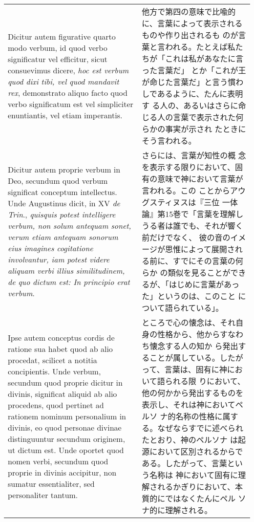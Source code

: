 \documentclass[10pt]{jsarticle} %
\begin{document}
\begin{longtable}{p{21em}p{21em}}
\\


Dicitur autem figurative quarto modo verbum, id quod verbo
 significatur vel efficitur, sicut consuevimus dicere, {\itshape hoc est verbum
 quod dixi tibi, vel quod mandavit rex}, demonstrato aliquo facto quod
 verbo significatum est vel simpliciter enuntiantis, vel etiam
 imperantis. 
&

他方で第四の意味で比喩的に、言葉によって表示されるものや作り出されるも
 のが言葉と言われる。たとえば私たちが「これは私があなたに言った言葉だ」
 とか「これが王が命じた言葉だ」と言う慣わしであるように、たんに表明す
 る人の、あるいはさらに命じる人の言葉で表示された何らかの事実が示され
 たときにそう言われる。


\\

Dicitur autem proprie verbum in Deo, secundum quod verbum
 significat conceptum intellectus. 
Unde Augustinus dicit, in XV {\itshape de
 Trin}., {\itshape quisquis potest intelligere verbum, non solum antequam sonet,
 verum etiam antequam sonorum eius imagines cogitatione involvantur,
 iam potest videre aliquam verbi illius similitudinem, de quo dictum
 est: In principio erat verbum}. 

&

さらには、言葉が知性の概
 念を表示する限りにおいて、固有の意味で神において言葉が言われる。この
 ことからアウグスティヌスは『三位
 一体論』第15巻で「言葉を理解しうる者は誰でも、それが響く前だけでなく、
 彼の音のイメージが思惟によって展開される前に、すでにその言葉の何らか
 の類似を見ることができるが、「はじめに言葉があった」というのは、このこと
 について語られている」。

\\

Ipse autem conceptus cordis de ratione
 sua habet quod ab alio procedat, scilicet a notitia
 concipientis.
 Unde verbum, secundum quod proprie dicitur in divinis,
 significat aliquid ab alio procedens, quod pertinet ad rationem
 nominum personalium in divinis, eo quod personae divinae
 distinguuntur secundum originem, ut dictum est. Unde oportet quod
 nomen verbi, secundum quod proprie in divinis accipitur, non sumatur
 essentialiter, sed personaliter tantum.

&

ところで心の懐念は、それ自身の性格から、他からすなわち懐念する人の知か
 ら発出することが属している。したがって、言葉は、固有に神において語られる限
 りにおいて、他の何かから発出するものを表示し、それは神においてペルソ
 ナ的名称の性格に属する。なぜならすでに述べられたとおり、神のペルソナ
 は起源において区別されるからである。したがって、言葉という名称は
 神において固有に理解されるかぎりにおいて、本質的にではなくたんにペル
 ソナ的に理解される。


\end{longtable}
\end{document}
